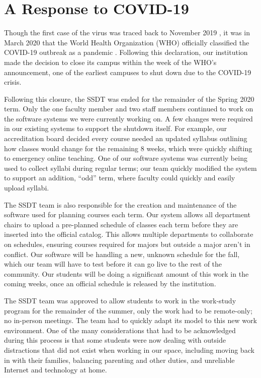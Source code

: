 \section{A Response to COVID-19}
Though the first case of the virus was traced back to November 2019 \cite{}, it was in March 2020 that the World Health Organization (WHO) officially classified the COVID-19 outbreak as a pandemic \cite{}. Following this declaration, our institution made the decision to close its campus within the week of the WHO's announcement, one of the earliest campuses to shut down due to the COVID-19 crisis.

Following this closure, the SSDT was ended for the remainder of the Spring 2020 term. Only the one faculty member and two staff members continued to work on the software systems we were currently working on. A few changes were required in our existing systems to support the shutdown itself. For example, our accreditation board decided every course needed an updated syllabus outlining how classes would change for the remaining 8 weeks, which were quickly shifting to emergency online teaching. One of our software systems was currently being used to collect syllabi during regular terms; our team quickly modified the system to support an addition, ``odd'' term, where faculty could quickly and easily upload syllabi.

The SSDT team is also responsible for the creation and maintenance of the software used for planning courses each term. Our system allows all department chairs to upload a pre-planned schedule of classes each term before they are inserted into the official catalog. This allows multiple departments to collaborate on schedules, ensuring courses required for majors but outside a major aren't in conflict. Our software will be handling a new, unknown schedule for the fall, which our team will have to test before it can go live to the rest of the community. Our students will be doing a significant amount of this work in the coming weeks, once an official schedule is released by the institution.

The SSDT team was approved to allow students to work in the work-study program for the remainder of the summer, only the work had to be remote-only; no in-person meetings. The team had to quickly adapt its model to this new work environment. One of the many considerations that had to be acknowledged during this process is that some students were now dealing with outside distractions that did not exist when working in our space, including moving back in with their families, balancing parenting and other duties, and unreliable Internet and technology at home.

